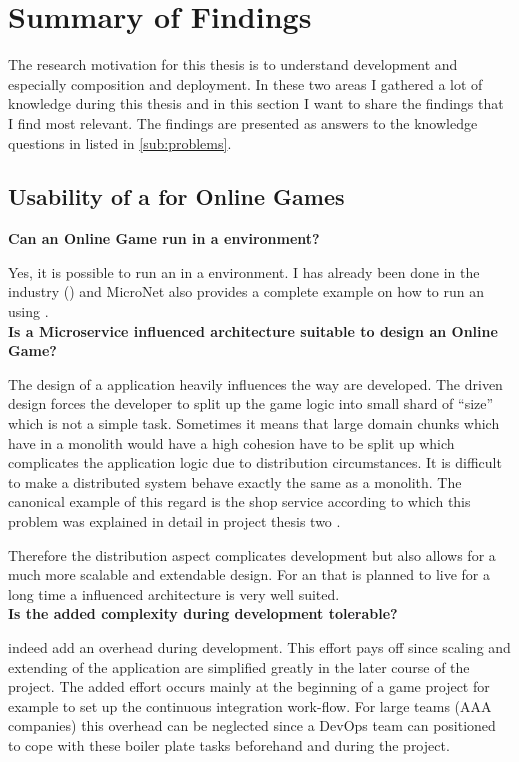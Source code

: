 \section{Summary of Findings}

The research motivation for this thesis is to understand \ms{} development and
especially \ms{} composition and deployment. In these two areas I gathered a lot
of knowledge during this thesis and in this section I want to share the findings
that I find most relevant. The findings are presented as answers to the
knowledge questions in listed in \autoref{sub:problems}.

\subsection{Usability of a \ms{} for Online Games}
\label{sub:usability_ms_og}

\noindent
\textbf{Can an Online Game run in a \ms{} environment?}

Yes, it is possible to run an \og{} in a \ms{} environment. I has already been
done in the industry (\cite{pronschinske2015turbine}) and MicroNet also
provides a complete example on how to run an \og{} using \mss{}.\\

\noindent
\textbf{Is a Microservice influenced architecture suitable to design an Online
Game?}

The design of a \og{} \mss{} application heavily influences the way \ogs{} are
developed. The \ms{} driven design forces the developer to split up the game
logic into small shard of \ms{} ``size'' which is not a simple task.
Sometimes it means that large domain chunks which have in a monolith would have
a high cohesion have to be split up which complicates the application logic due
to distribution circumstances. It is difficult to make a distributed system
behave exactly the same as a monolith. The canonical example of this regard is
the shop service according to which this problem was explained in detail in
project thesis two .

Therefore the distribution aspect complicates development but also allows for
a much more scalable and extendable design. For an \og{} that is
planned to live for a long time a \ms{} influenced architecture is very well
suited.\\

\noindent
\textbf{Is the added complexity during development tolerable?}

\mss{} indeed  add an overhead during development. This effort pays off
since scaling and extending of the application are simplified greatly in the
later course of the project. The added effort occurs mainly at the beginning of
a game project for example to set up the continuous integration work-flow. For
large teams (AAA companies) this overhead can be neglected since a DevOps team
can positioned to cope with these boiler plate tasks beforehand and during the
project.

